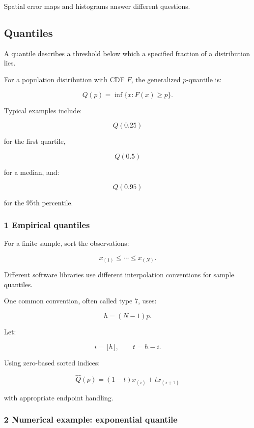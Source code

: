Spatial error maps and histograms answer different questions.

\subsection{Quantiles}\label{02-foundations-ii-ch030-quantiles}

\hypertarget{02-foundations-ii-ch030-quantiles}{}

A quantile describes a threshold below which a specified fraction of a distribution lies.

For a population distribution with CDF \(F\), the generalized \(p\)-quantile is:

\[
 \boxed{ Q(p)=\inf\{x:F(x)\ge p\} }.
\]

Typical examples include:

\[
 Q(0.25)
\]

for the first quartile,

\[
 Q(0.5)
\]

for a median, and:

\[
 Q(0.95)
\]

for the 95th percentile.

\subsubsection{1 Empirical quantiles}\label{02-foundations-ii-ch030-empirical-quantiles}

\hypertarget{02-foundations-ii-ch030-empirical-quantiles}{}

For a finite sample, sort the observations:

\[
 x_{(1)}\le\cdots\le x_{(N)}.
\]

Different software libraries use different interpolation conventions for sample quantiles.

One common convention, often called type 7, uses:

\[
 h=(N-1)p.
\]

Let:

\[
 i=\lfloor h\rfloor, \qquad t=h-i.
\]

Using zero-based sorted indices:

\[
 \boxed{ \hat Q(p)=(1-t)x_{(i)}+t x_{(i+1)} }
\]

with appropriate endpoint handling.

\subsubsection{2 Numerical example: exponential quantile}\label{02-foundations-ii-ch030-numerical-example-exponential-quantile}

